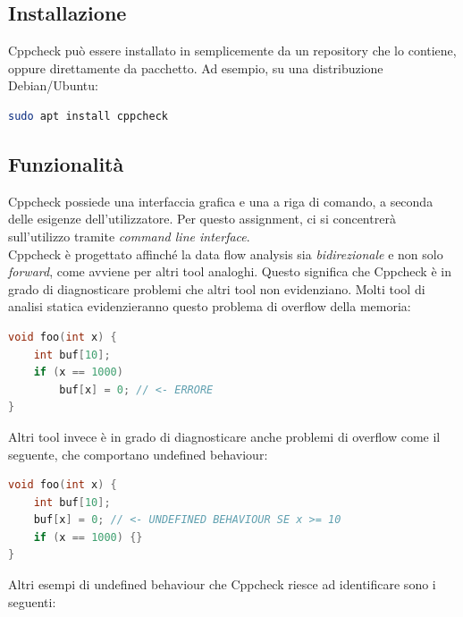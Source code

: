 \documentclass{article}
\begin{document}
\subsection{Installazione}
\label{sec:cppcheck:installazione}

Cppcheck può essere installato in semplicemente da un repository
che lo contiene, oppure direttamente da pacchetto. Ad esempio, su
una distribuzione Debian/Ubuntu: \\

\begin{lstlisting}[language=bash]
sudo apt install cppcheck
\end{lstlisting}

\subsection{Funzionalità}
\label{sec:cppcheck:funzionalita}

Cppcheck possiede una interfaccia grafica e una a riga di comando, a seconda
delle esigenze dell'utilizzatore. Per questo assignment, ci si concentrerà
sull'utilizzo tramite \emph{command line interface}. \\

Cppcheck è progettato affinché la data flow analysis sia \emph{bidirezionale} e non
solo \emph{forward}, come avviene per altri tool analoghi. Questo significa che
Cppcheck è in grado di diagnosticare problemi che altri tool non evidenziano.
Molti tool di analisi statica evidenzieranno questo problema di overflow della memoria:

\begin{lstlisting}[language=c]
void foo(int x) {
    int buf[10];
    if (x == 1000)
        buf[x] = 0; // <- ERRORE
}
\end{lstlisting}

Altri tool invece è in grado di diagnosticare anche problemi di overflow come il
seguente, che comportano undefined behaviour:

\begin{lstlisting}[language=c]
void foo(int x) {
    int buf[10];
    buf[x] = 0; // <- UNDEFINED BEHAVIOUR SE x >= 10
    if (x == 1000) {}
}
\end{lstlisting}

Altri esempi di undefined behaviour che Cppcheck riesce ad identificare sono i
seguenti:
\end{document}
